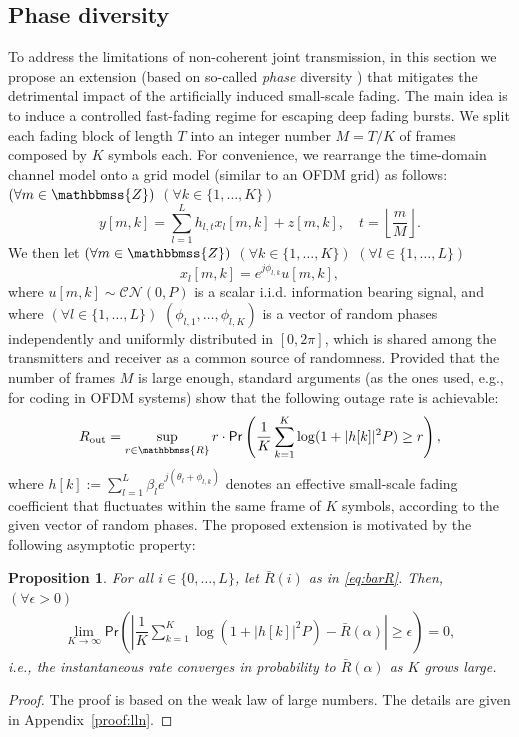 \documentclass[10pt,journal,a4paper]{IEEEtran}
\newcommand{\eqdef}{:=}
\renewcommand{\P}{\mathsf{Pr}} 			%
\newcommand{\stdset}[1]{\mathbbmss{#1}}	%
\newcommand{\CN}{\mathcal{CN}}			%
\newtheorem{proposition}{Proposition}
\begin{document}
\subsection{Phase diversity}
To address the limitations of non-coherent joint transmission, in this section we propose an extension (based on so-called \textit{phase} diversity \cite{dammann2002low}) that mitigates the detrimental impact of the artificially induced small-scale fading. The main idea is to induce a controlled fast-fading regime for escaping deep fading bursts. We split each fading block of length $T$ into an integer number $M = T/K$ of frames composed by $K$ symbols each. For convenience, we rearrange the time-domain channel model onto a grid model (similar to an OFDM grid) as follows: $(\forall m \in \stdset{Z})$ $(\forall k\in \{1,\ldots,K\})$ 
\begin{equation}\label{eq:model_phase_div}
y[m,k] = \sum_{l=1}^Lh_{l,t}x_l[m,k] +z[m,k],\quad t=\left\lfloor \frac{m}{M}\right\rfloor. 
\end{equation}
We then let $(\forall m \in \stdset{Z})$ $(\forall k\in \{1,\ldots,K\})$ $(\forall l \in \{1,\ldots,L\})$
\begin{equation}\label{eq:signal_phase_div}
x_l[m,k] = e^{j\phi_{l,k}}u[m,k],
\end{equation}
where $u[m,k]\sim \CN(0,P)$ is a scalar i.i.d. information bearing signal, and where $(\forall l \in\{1,\ldots,L\})$ $(\phi_{l,1},\ldots,\phi_{l,K})$ is a vector of random phases independently and uniformly distributed in $[0,2\pi]$, which is shared among the transmitters and receiver as a common source of randomness. Provided that the number of frames $M$ is large enough, standard arguments (as the ones used, e.g., for coding in OFDM systems) show that the following outage rate is achievable:
\begin{equation*}
R_{\mathrm{out}} = \sup_{r\in \stdset{R}} r\cdot \P\left(\dfrac{1}{K}\sum_{k=1}^K\log(1+|h[k]|^2P) \geq r\right),
\end{equation*}
where $h[k] \eqdef \sum_{l=1}^L\beta_l e^{j(\theta_l+\phi_{l,k})}$ denotes an effective small-scale fading coefficient that fluctuates within the same frame of $K$ symbols, according to the given vector of random phases. The proposed extension is motivated by the following asymptotic property:

\begin{proposition}\label{prop:lln} For all $i\in \{0,\ldots,L\}$, let $\bar{R}(i)$ as in \eqref{eq:barR}. Then, $(\forall \epsilon > 0)$
\begin{align*}
\lim_{K\to \infty}\P\left(\left|\dfrac{1}{K}\sum_{k=1}^{K}\log(1+|h[k]|^2P)-\bar{R}(\alpha) \right|\geq \epsilon\right)=0,
\end{align*}
i.e., the instantaneous rate converges in probability to $\bar{R}(\alpha)$ as $K$ grows large.
\end{proposition}
\begin{proof}
The proof is based on the weak law of large numbers. The details are given in Appendix~\ref{proof:lln}.
\end{proof}
\end{document}
